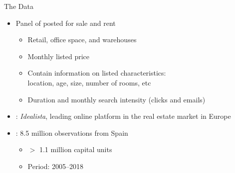 \documentclass[english,xcolor=svgnames,aspectratio=169]{beamer}
\begin{document}
\begin{frame}[label=thedata]{The Data}

\begin{itemize}

\item Panel of {\color{dred}{capital structures}} posted for sale and rent  \smallskip
\begin{itemize}
\item Retail, office space, and warehouses \smallskip
\item Monthly listed price \smallskip
\item Contain information on listed characteristics: \\ location, age, size, number of rooms, etc \smallskip
\item Duration and monthly search intensity (clicks and emails)
\end{itemize}\bigskip


\item {\color{dblue}{Source}}: \textit{Idealista}, leading online platform in the real estate market in Europe \bigskip

\item {\color{dblue}{Coverage}}: 8.5 million observations from Spain \smallskip
\begin{itemize}
\item $>$ 1.1 million capital units \smallskip
\item Period: 2005--2018
\end{itemize}

\end{itemize}


\end{frame}



\end{document}
